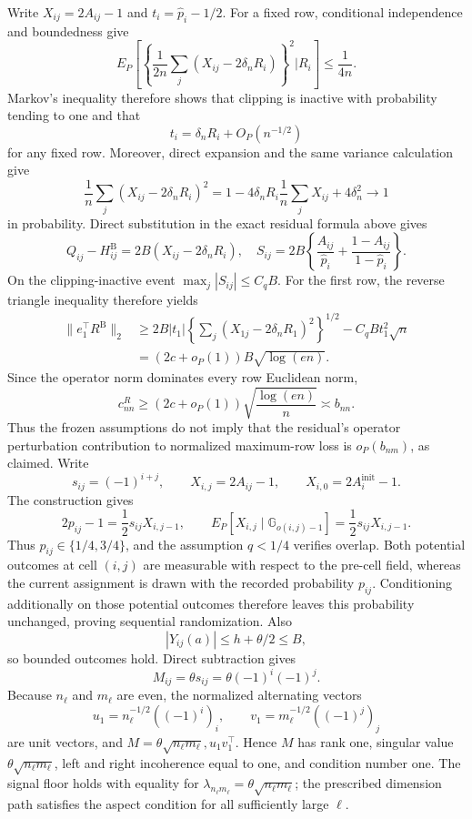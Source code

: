 Write \(X_{ij}=2A_{ij}-1\) and \(t_i=\widehat p_i-1/2\).  For a fixed row, conditional independence and boundedness give
\[
 E_P\!\left[\left\{\frac1{2n}\sum_j(X_{ij}-2\delta_nR_i)\right\}^2
 \mathrel{\Big|}R_i\right]\le\frac1{4n}.
\]
Markov's inequality therefore shows that clipping is inactive with probability tending to one and that
\[
 t_i=\delta_nR_i+O_P(n^{-1/2})
\]
for any fixed row.  Moreover, direct expansion and the same variance calculation give
\[
 \frac1n\sum_j(X_{ij}-2\delta_nR_i)^2
 =1-4\delta_nR_i\frac1n\sum_jX_{ij}+4\delta_n^2
 \longrightarrow1
\]
in probability.  Direct substitution in the exact residual formula above gives
\[
 Q_{ij}-H^{\mathrm B}_{ij}=2B(X_{ij}-2\delta_nR_i),
 \quad
 S_{ij}=2B\left\{\frac{A_{ij}}{\widehat p_i}
 +\frac{1-A_{ij}}{1-\widehat p_i}\right\}.
\]
On the clipping-inactive event \(\max_j|S_{ij}|\le C_qB\).  For the first row, the reverse triangle inequality therefore yields
\[
 \begin{aligned}
 \lVert e_1^\top R^{\mathrm B}\rVert_2
 &\ge 2B|t_1|
 \left\{\sum_j(X_{1j}-2\delta_nR_1)^2\right\}^{1/2}
 -C_qBt_1^2\sqrt n\\
 &=(2c+o_P(1))B\sqrt{\log(en)}.
 \end{aligned}
\]
Since the operator norm dominates every row Euclidean norm,
\[
 c^R_{nn}\ge(2c+o_P(1))\sqrt{\frac{\log(en)}n}\asymp b_{nn}.
\]
Thus the frozen assumptions do not imply that the residual's operator perturbation contribution to normalized maximum-row loss is \(o_P(b_{nm})\), as claimed.
Write
\[
 s_{ij}=(-1)^{i+j},\qquad X_{i,j}=2A_{ij}-1,
 \qquad X_{i,0}=2A_i^{\mathrm{init}}-1.
\]
The construction gives
\[
 2p_{ij}-1=\frac12s_{ij}X_{i,j-1},
 \qquad
 E_P[X_{i,j}\mid\mathbb G_{o(i,j)-1}]
 =\frac12s_{ij}X_{i,j-1}.
\]
Thus \(p_{ij}\in\{1/4,3/4\}\), and the assumption \(q<1/4\) verifies overlap.  Both potential outcomes at cell \((i,j)\) are measurable with respect to the pre-cell field, whereas the current assignment is drawn with the recorded probability \(p_{ij}\).  Conditioning additionally on those potential outcomes therefore leaves this probability unchanged, proving sequential randomization.  Also
\[
 |Y_{ij}(a)|\le h+\theta/2\le B,
\]
so bounded outcomes hold.  Direct subtraction gives
\[
 M_{ij}=\theta s_{ij}=\theta(-1)^i(-1)^j.
\]
Because \(n_\ell\) and \(m_\ell\) are even, the normalized alternating vectors
\[
 u_1=n_\ell^{-1/2}((-1)^i)_i,
 \qquad
 v_1=m_\ell^{-1/2}((-1)^j)_j
\]
are unit vectors, and \(M=\theta\sqrt{n_\ell m_\ell},u_1v_1^\top\).  Hence \(M\) has rank one, singular value \(\theta\sqrt{n_\ell m_\ell}\), left and right incoherence equal to one, and condition number one.  The signal floor holds with equality for \(\lambda_{n_\ell m_\ell}=\theta\sqrt{n_\ell m_\ell}\); the prescribed dimension path satisfies the aspect condition for all sufficiently large \(\ell\).

